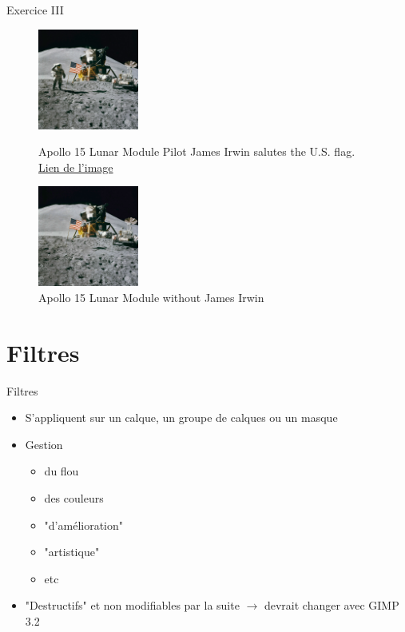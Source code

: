 \documentclass[10pt,svgnames,usenames,table]{beamer}
\begin{document}
	\begin{frame}{Exercice III}

		\begin{figure}[H]
			\centering
			\begin{minipage}{.5\textwidth}
				\centering
				\includegraphics[height=125px]{Images/purge/Apollo_15_flag,_rover,_LM,_Irwin}
				\caption{\tiny{Apollo 15 Lunar Module Pilot James Irwin salutes the U.S. flag.\\\href{http://louvainlinux.github.io/atelier-gimp/src/Images/purge/Apollo_15_flag,_rover,_LM,_Irwin.jpg}{Lien de l'image}}}
			\end{minipage}%
			\begin{minipage}{.5\textwidth}
				\centering
				\includegraphics[height=125px]{Images/purge/Apollo_15_flag,_rover,_LM}
				\caption{\tiny{Apollo 15 Lunar Module without James Irwin}}
			\end{minipage}
		\end{figure}
	\end{frame}



\section{Filtres}
	\begin{frame}{Filtres}
		\begin{itemize}
			\item S'appliquent sur un calque, un groupe de calques ou un masque
			\item Gestion 
				\begin{itemize}
				\item du flou
				\item des couleurs
				\item "d'amélioration"
				\item "artistique"
				\item etc
				\end{itemize}
			\item "Destructifs" et non modifiables par la suite $\rightarrow$ devrait changer avec GIMP 3.2
		\end{itemize}
	\end{frame}
\end{document}

